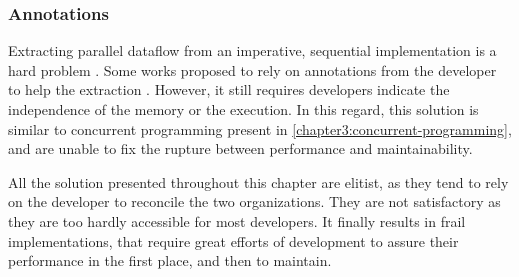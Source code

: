 \subsubsection{Annotations}

Extracting parallel dataflow from an imperative, sequential implementation is a hard problem \cite{Johnston2004a}.
Some works proposed to rely on annotations from the developer to help the extraction \cite{Vandierendonck2010a,Fernandez2014a}.
However, it still requires developers indicate the independence of the memory or the execution.
In this regard, this solution is similar to concurrent programming present in \ref{chapter3:concurrent-programming}, and are unable to fix the rupture between performance and maintainability.

All the solution presented throughout this chapter are elitist, as they tend to rely on the developer to reconcile the two organizations.
They are not satisfactory as they are too hardly accessible for most developers.
It finally results in frail implementations, that require great efforts of development to assure their performance in the first place, and then to maintain.

\endinput


Continuations and coroutines \cite{Haynes1984}
-> THIS

Parallel closures, a new twist on an old idea \cite{Matsakis2012a}

Continuation of work on SEDA \cite{Salmito2014}



From control flow to dataflow \cite{Beck1991}


-> THIS, to read
Automatic Extraction of Coarse-Grained Data-Flow Threads from Imperative Programs \cite{Li2012}
In this paper all parallelism are extracted (data, task and pipeline).


Commutativity analysis: A new analysis framework for parallelizing compilers \cite{Rinard1996}
In this paper, they analyze commutative operations to parallelize them.
It is novel because it isn't about parallelizing loops.
However, it is not exactly pipeline parallelism either.


Interesting articles :

http://comjnl.oxfordjournals.org/content/early/2015/09/15/comjnl.bxv077.abstract


